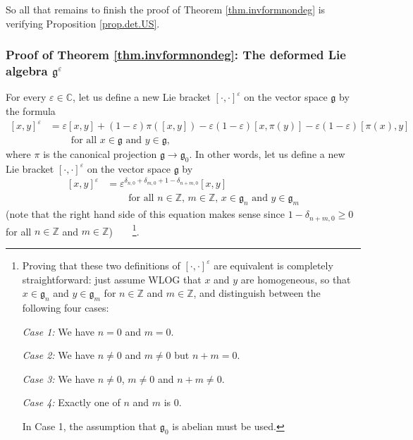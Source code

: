 \documentclass
[numbers=enddot,12pt,final,onecolumn,german,notitlepage]{scrartcl}%
\theoremstyle{definition}
\begin{document}
So all that remains to finish the proof of Theorem \ref{thm.invformnondeg} is
verifying Proposition \ref{prop.det.US}.

\subsubsection{Proof of Theorem \ref{thm.invformnondeg}: The deformed Lie
algebra $\mathfrak{g}^{\varepsilon}$}

For every $\varepsilon\in\mathbb{C}$, let us define a new Lie bracket $\left[
\cdot,\cdot\right]  ^{\varepsilon}$ on the vector space $\mathfrak{g}$ by the
formula%
\begin{align}
\left[  x,y\right]  ^{\varepsilon}  &  =\varepsilon\left[  x,y\right]
+\left(  1-\varepsilon\right)  \pi\left(  \left[  x,y\right]  \right)
-\varepsilon\left(  1-\varepsilon\right)  \left[  x,\pi\left(  y\right)
\right]  -\varepsilon\left(  1-\varepsilon\right)  \left[  \pi\left(
x\right)  ,y\right] \label{pf.invformnondeg.g^epsi.1}\\
&  \ \ \ \ \ \ \ \ \ \ \text{for all }x\in\mathfrak{g}\text{ and }%
y\in\mathfrak{g},\nonumber
\end{align}
where $\pi$ is the canonical projection $\mathfrak{g}\rightarrow
\mathfrak{g}_{0}$. In other words, let us define a new Lie bracket $\left[
\cdot,\cdot\right]  ^{\varepsilon}$ on the vector space $\mathfrak{g}$ by%
\begin{align}
\left[  x,y\right]  ^{\varepsilon}  &  =\varepsilon^{\delta_{n,0}+\delta
_{m,0}+1-\delta_{n+m,0}}\left[  x,y\right]  \label{pf.invformnondeg.g^epsi.2}%
\\
&  \ \ \ \ \ \ \ \ \ \ \text{for all }n\in\mathbb{Z}\text{, }m\in
\mathbb{Z}\text{, }x\in\mathfrak{g}_{n}\text{ and }y\in\mathfrak{g}%
_{m}\nonumber
\end{align}
(note that the right hand side of this equation makes sense since
$1-\delta_{n+m,0}\geq0$ for all $n\in\mathbb{Z}$ and $m\in\mathbb{Z}%
$)\ \ \ \ \footnote{Proving that these two definitions of $\left[  \cdot
,\cdot\right]  ^{\varepsilon}$ are equivalent is completely straightforward:
just assume WLOG that $x$ and $y$ are homogeneous, so that $x\in
\mathfrak{g}_{n}$ and $y\in\mathfrak{g}_{m}$ for $n\in\mathbb{Z}$ and
$m\in\mathbb{Z}$, and distinguish between the following four cases:
\par
\textit{Case 1:} We have $n=0$ and $m=0$.
\par
\textit{Case 2:} We have $n\neq0$ and $m\neq0$ but $n+m=0$.
\par
\textit{Case 3:} We have $n\neq0$, $m\neq0$ and $n+m\neq0$.
\par
\textit{Case 4:} Exactly one of $n$ and $m$ is $0$.
\par
In Case 1, the assumption that $\mathfrak{g}_{0}$ is abelian must be used.}.
\end{document}
